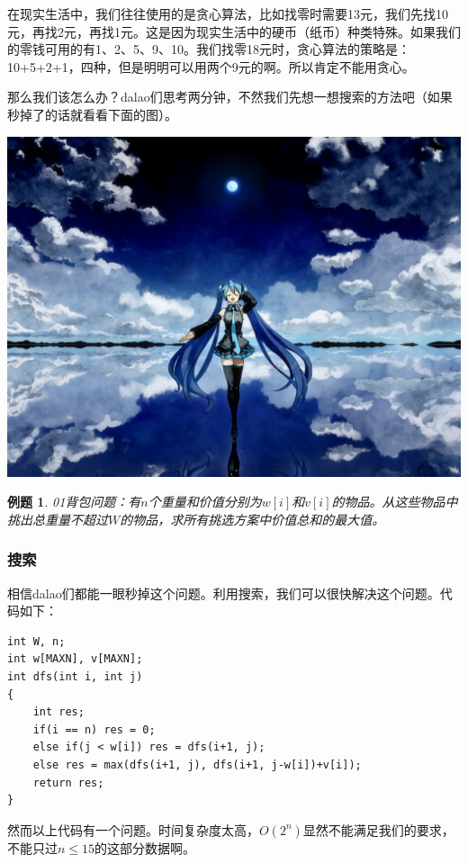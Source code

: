 \documentclass{article}
\newtheorem{example}{例题}[subsection]
\theoremstyle{nonumberplain}
\begin{document}
在现实生活中，我们往往使用的是贪心算法，比如找零时需要13元，我们先找10元，再找2元，再找1元。这是因为现实生活中的硬币（纸币）种类特殊。如果我们的零钱可用的有1、2、5、9、10。我们找零18元时，贪心算法的策略是：10+5+2+1，四种，但是明明可以用两个9元的啊。所以肯定不能用贪心。

那么我们该怎么办？dalao们思考两分钟，不然我们先想一想搜索的方法吧（如果秒掉了的话就看看下面的图）。

\begin{center}\includegraphics[scale=0.8]{6081163_p0.jpg}\end{center}
\newpage
\begin{example}\rm{01}背包问题：有$n$个重量和价值分别为$w[i]$和$v[i]$的物品。从这些物品中挑出总重量不超过$W$的物品，求所有挑选方案中价值总和的最大值。\end{example}

\subsubsection{搜索}
相信dalao们都能一眼秒掉这个问题。利用搜索，我们可以很快解决这个问题。代码如下：
\begin{verbatim}  
int W, n;
int w[MAXN], v[MAXN];  
int dfs(int i, int j)
{  
    int res;  
    if(i == n) res = 0;   
    else if(j < w[i]) res = dfs(i+1, j);  
    else res = max(dfs(i+1, j), dfs(i+1, j-w[i])+v[i]);  
    return res;  
}
\end{verbatim}

然而以上代码有一个问题。时间复杂度太高，$O(2^n)$显然不能满足我们的要求，不能只过$n\leq15$的这部分数据啊。
\end{document}
